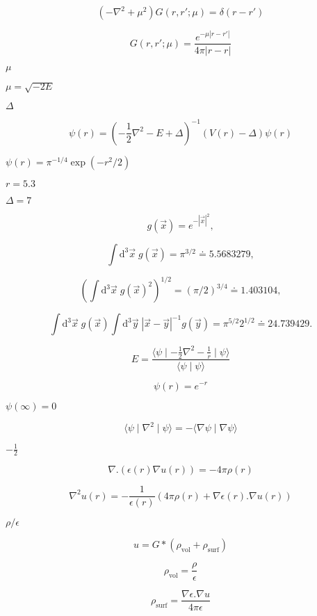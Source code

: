 \documentclass{article}
\begin{document}
\[
\left(-\nabla^2 + \mu^2 \right) G(r,r'; \mu) = \delta(r-r')
\]
\pagebreak

\[
G(r,r'; \mu) = \frac{e^{-\mu |r-r'|}}{4 \pi |r-r|}
\]
\pagebreak

$\mu$
\pagebreak

$\mu = \sqrt{-2 E}$
\pagebreak

$\Delta$
\pagebreak

\[
\psi(r) = \left( -\frac{1}{2} \nabla^2 - E + \Delta \right)^{-1} \left( V(r) -\Delta\right)  \psi(r)
\]
\pagebreak

$\psi(r)=\pi^{-1/4}\exp(-r^2 / 2)$
\pagebreak

$r=5.3$
\pagebreak

$\Delta=7$
\pagebreak

\[ g(\vec{x}) = e^{-|\vec{x}|^2}, \]
\pagebreak

\[
   \int \mathrm{d}^3 \vec{x} \; g(\vec{x}) = \pi^{3/2} \doteq 5.5683279,
\]
\pagebreak

\[
   \left( \int \mathrm{d}^3 \vec{x} \; g(\vec{x})^2 \right)^{1/2} = (\pi/2)^{3/4} \doteq 1.403104,
\]
\pagebreak

\[
   \int \mathrm{d}^3 \vec{x} \; g(\vec{x}) \int \mathrm{d}^3 \vec{y} \; |\vec{x}-\vec{y}|^{-1} g(\vec{y}) = \pi^{5/2} 2^{1/2} \doteq 24.739429.
\]
\pagebreak

\[
    E = \frac{\langle \psi \mid - \frac{1}{2}  \nabla^2  - \frac{1}{r} \mid \psi \rangle}{\langle \psi \mid \psi \rangle}
\]
\pagebreak

\[
   \psi(r) = e^{-r}
\]
\pagebreak

$ \psi(\infty)=0 $
\pagebreak

\[
     \langle \psi \mid \nabla^2 \mid \psi \rangle = - \langle \nabla \psi \mid \nabla \psi \rangle
\]
\pagebreak

$-\frac{1}{2}$
\pagebreak

\[
\nabla . \left( \epsilon(r) \nabla u(r)  \right) = - 4 \pi \rho(r)
\]
\pagebreak

\[
   \nabla^2 u(r) = - \frac{1}{\epsilon(r)} \left( 4 \pi \rho(r) + \nabla \epsilon(r) .  \nabla u(r) \right)
\]
\pagebreak

$\rho / \epsilon$
\pagebreak

\[
   u = G * \left(\rho_{\mbox{vol}} + \rho_{\mbox{surf}} \right)
\]
\pagebreak

\[
   \rho_{\mbox{vol}} = \frac{\rho}{\epsilon}
\]
\pagebreak

\[
   \rho_{\mbox{surf}} = \frac{\nabla \epsilon .  \nabla u}{4 \pi \epsilon}
\]
\pagebreak
\end{document}
